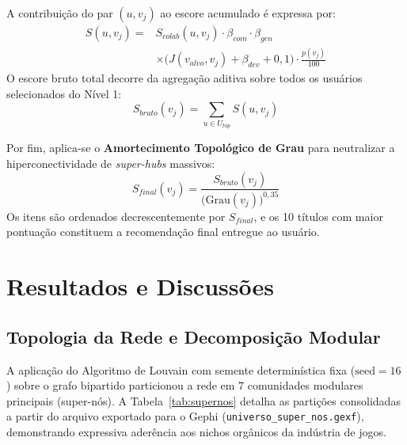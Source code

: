 \documentclass[conference]{IEEEtran}
\begin{document}
A contribuição do par $(u, v_j)$ ao escore acumulado é expressa por:
\begin{equation}
\begin{split}
S(u, v_j) = {} & S_{colab}(u, v_j) \cdot \beta_{com} \cdot \beta_{gen} \\
& \times \Big(J(v_{alvo}, v_j) + \beta_{dev} + 0{,}1\Big) \cdot \frac{p(v_j)}{100}
\end{split}
\end{equation}
O escore bruto total decorre da agregação aditiva sobre todos os usuários selecionados do Nível 1:
\begin{equation}
S_{bruto}(v_j) = \sum_{u \in U_{top}} S(u, v_j)
\end{equation}

Por fim, aplica-se o \textbf{Amortecimento Topológico de Grau} para neutralizar a hiperconectividade de \textit{super-hubs} massivos:
\begin{equation}
S_{final}(v_j) = \frac{S_{bruto}(v_j)}{\Big( \text{Grau}(v_j) \Big)^{0{,}35}}
\label{eq:amortecimento}
\end{equation}
Os itens são ordenados decrescentemente por $S_{final}$, e os 10 títulos com maior pontuação constituem a recomendação final entregue ao usuário.

\section{Resultados e Discussões}

\subsection{Topologia da Rede e Decomposição Modular}
A aplicação do Algoritmo de Louvain com semente determinística fixa ($\text{seed} = 16$) sobre o grafo bipartido particionou a rede em 7 comunidades modulares principais (super-nós). A Tabela~\ref{tab:supernos} detalha as partições consolidadas a partir do arquivo exportado para o Gephi (\texttt{universo\_super\_nos.gexf}), demonstrando expressiva aderência aos nichos orgânicos da indústria de jogos.
\end{document}
